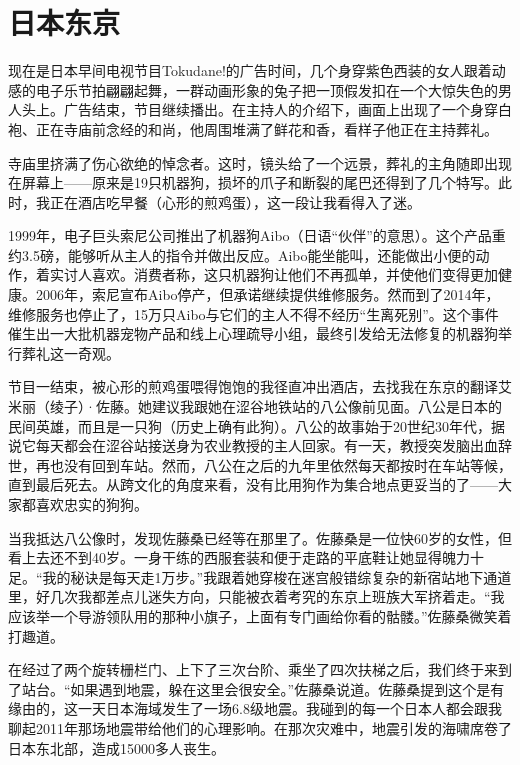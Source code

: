 \documentclass[12pt,oneside]{book}
\begin{document}
\section{日本东京}
\begin{bookref}[frametitle={\cite{好好告别}}]

现在是日本早间电视节目Tokudane!的广告时间，几个身穿紫色西装的女人跟着动感的电子乐节拍翩翩起舞，一群动画形象的兔子把一顶假发扣在一个大惊失色的男人头上。广告结束，节目继续播出。在主持人的介绍下，画面上出现了一个身穿白袍、正在寺庙前念经的和尚，他周围堆满了鲜花和香，看样子他正在主持葬礼。

寺庙里挤满了伤心欲绝的悼念者。这时，镜头给了一个远景，葬礼的主角随即出现在屏幕上——原来是19只机器狗，损坏的爪子和断裂的尾巴还得到了几个特写。此时，我正在酒店吃早餐（心形的煎鸡蛋），这一段让我看得入了迷。

1999年，电子巨头索尼公司推出了机器狗Aibo（日语“伙伴”的意思）。这个产品重约3.5磅，能够听从主人的指令并做出反应。Aibo能坐能叫，还能做出小便的动作，着实讨人喜欢。消费者称，这只机器狗让他们不再孤单，并使他们变得更加健康。2006年，索尼宣布Aibo停产，但承诺继续提供维修服务。然而到了2014年，维修服务也停止了，15万只Aibo与它们的主人不得不经历“生离死别”。这个事件催生出一大批机器宠物产品和线上心理疏导小组，最终引发给无法修复的机器狗举行葬礼这一奇观。

节目一结束，被心形的煎鸡蛋喂得饱饱的我径直冲出酒店，去找我在东京的翻译艾米丽（绫子）·佐藤。她建议我跟她在涩谷地铁站的八公像前见面。八公是日本的民间英雄，而且是一只狗（历史上确有此狗）。八公的故事始于20世纪30年代，据说它每天都会在涩谷站接送身为农业教授的主人回家。有一天，教授突发脑出血辞世，再也没有回到车站。然而，八公在之后的九年里依然每天都按时在车站等候，直到最后死去。从跨文化的角度来看，没有比用狗作为集合地点更妥当的了——大家都喜欢忠实的狗狗。

当我抵达八公像时，发现佐藤桑已经等在那里了。佐藤桑是一位快60岁的女性，但看上去还不到40岁。一身干练的西服套装和便于走路的平底鞋让她显得魄力十足。“我的秘诀是每天走1万步。”我跟着她穿梭在迷宫般错综复杂的新宿站地下通道里，好几次我都差点儿迷失方向，只能被衣着考究的东京上班族大军挤着走。“我应该举一个导游领队用的那种小旗子，上面有专门画给你看的骷髅。”佐藤桑微笑着打趣道。

在经过了两个旋转栅栏门、上下了三次台阶、乘坐了四次扶梯之后，我们终于来到了站台。“如果遇到地震，躲在这里会很安全。”佐藤桑说道。佐藤桑提到这个是有缘由的，这一天日本海域发生了一场6.8级地震。我碰到的每一个日本人都会跟我聊起2011年那场地震带给他们的心理影响。在那次灾难中，地震引发的海啸席卷了日本东北部，造成15000多人丧生。


\end{bookref}
\end{document}
